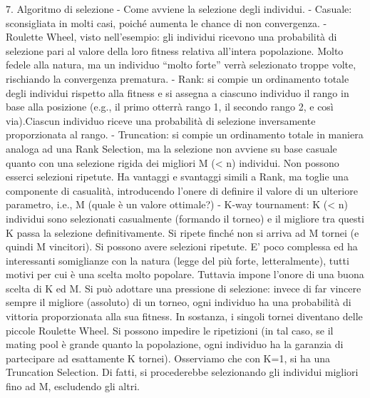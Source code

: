 \documentclass{article}
\begin{document}
    7. Algoritmo di selezione - Come avviene la selezione degli individui.
    - Casuale: sconsigliata in molti casi, poiché aumenta le chance di non convergenza.
    - Roulette Wheel, visto nell’esempio: gli individui ricevono una probabilità di selezione pari al valore della loro fitness relativa all’intera popolazione.
    Molto fedele alla natura, ma un individuo “molto forte” verrà selezionato troppe volte, rischiando la convergenza prematura.
    - Rank: si compie un ordinamento totale degli individui rispetto alla fitness e si assegna a ciascuno individuo il rango in base alla posizione (e.g.,
    il primo otterrà rango 1, il secondo rango 2, e così via).Ciascun individuo riceve una probabilità di selezione inversamente proporzionata al rango.
    - Truncation: si compie un ordinamento totale in maniera analoga ad una Rank Selection, ma la selezione non avviene su base casuale quanto con una selezione
    rigida dei migliori M (< n) individui. Non possono esserci selezioni ripetute.
    Ha vantaggi e svantaggi simili a Rank, ma toglie una componente di casualità, introducendo l’onere di definire il valore di un ulteriore parametro, i.e., M
    (quale è un valore ottimale?)
    - K-way tournament: K (< n) individui sono selezionati casualmente (formando il torneo) e il migliore tra questi K passa la selezione definitivamente.
    Si ripete finché non si arriva ad M tornei (e quindi M vincitori). Si possono avere selezioni ripetute.
    E’ poco complessa ed ha interessanti somiglianze con la natura (legge del più forte, letteralmente), tutti motivi per cui è una scelta molto popolare.
    Tuttavia impone l’onore di una buona scelta di K ed M.
    Si può adottare una pressione di selezione: invece di far vincere sempre il migliore (assoluto) di un torneo, ogni individuo ha una probabilità di vittoria
    proporzionata alla sua fitness. In sostanza, i singoli tornei diventano delle piccole Roulette Wheel.
    Si possono impedire le ripetizioni (in tal caso, se il mating pool è grande quanto la popolazione, ogni individuo ha la garanzia di partecipare ad esattamente K
    tornei).
    Osserviamo che con K=1, si ha una Truncation Selection. Di fatti, si procederebbe selezionando gli individui migliori fino ad M, escludendo gli altri.
\end{document}
